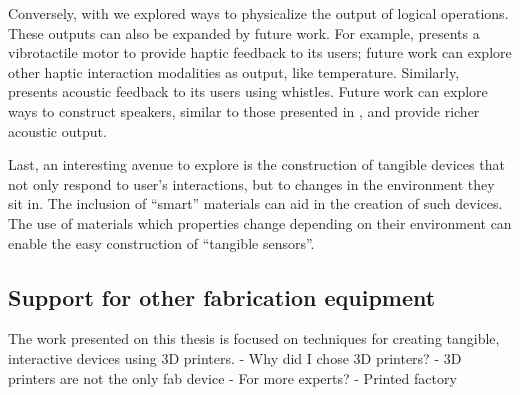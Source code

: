       Conversely, with \al we explored ways to physicalize the output of logical
      operations. These outputs can also be expanded by future work. For
      example, \al presents a vibrotactile motor to provide haptic feedback to
      its users; future work can explore other haptic interaction modalities as
      output, like temperature. Similarly, \al presents acoustic feedback to its
      users using whistles. Future work can explore \pap ways to construct
      speakers, similar to those presented in \cite{Ishiguro:2014}, and provide
      richer acoustic output.

      Last, an interesting avenue to explore is the construction of tangible
      devices that not only respond to user's interactions, but to changes in
      the environment they sit in. The inclusion of ``smart'' materials can aid
      in the creation of such devices. The use of materials which properties
      change depending on their environment can enable the easy construction of
      ``tangible sensors''.
    
    \subsection{Support for other fabrication equipment}
      The work presented on this thesis is focused on techniques for creating
      tangible, interactive devices using 3D printers. 
        - Why did I chose 3D printers?
        - 3D printers are not the only fab device
        - For more experts?
        - Printed factory